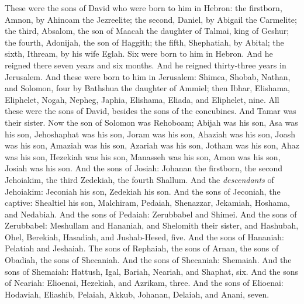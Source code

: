 \begin{biblechapter} %
 These were the sons of David who were born to him in Hebron: the firstborn, Amnon, by Ahinoam the Jezreelite; the second, Daniel, by Abigail the Carmelite;
\verse the third, Absalom, the son of Maacah the daughter of Talmai, king of Geshur; the fourth, Adonijah, the son of Haggith;
\verse the fifth, Shephatiah, by Abital; the sixth, Ithream, by his wife Eglah.
\verse Six were born to him in Hebron. And he reigned there seven years and six months. And he reigned thirty-three years in Jerusalem.
\verse And these were born to him in Jerusalem: Shimea, Shobab, Nathan, and Solomon, four by Bathshua the daughter of Ammiel;
\verse then Ibhar, Elishama, Eliphelet,
\verse Nogah, Nepheg, Japhia,
\verse Elishama, Eliada, and Eliphelet, nine.
\verse All these were the sons of David, besides the sons of the concubines. And Tamar was their sister.
\verse Now the son of Solomon was Rehoboam; Abijah was his son, Asa was his son, Jehoshaphat was his son,
\verse Joram was his son, Ahaziah was his son, Joash was his son,
\verse Amaziah was his son, Azariah was his son, Jotham was his son,
\verse Ahaz was his son, Hezekiah was his son, Manasseh was his son,
\verse Amon was his son, Josiah was his son.
\verse And the sons of Josiah: Johanan the firstborn, the second Jehoiakim, the third Zedekiah, the fourth Shallum.
\verse And the \textit{descendants} of Jehoiakim: Jeconiah his son, Zedekiah his son.
\verse And the sons of Jeconiah, the captive: Shealtiel his son,
\verse Malchiram, Pedaiah, Shenazzar, Jekamiah, Hoshama, and Nedabiah.
\verse And the sons of Pedaiah: Zerubbabel and Shimei. And the sons of Zerubbabel: Meshullam and Hananiah, and Shelomith their sister,
\verse and Hashubah, Ohel, Berekiah, Hasadiah, and Jushab-Hesed, five.
\verse And the sons of Hananiah: Pelatiah and Jeshaiah. The sons of Rephaiah, the sons of Arnan, the sons of Obadiah, the sons of Shecaniah.
\verse And the sons of Shecaniah: Shemaiah. And the sons of Shemaiah: Hattush, Igal, Bariah, Neariah, and Shaphat, six.
\verse And the sons of Neariah: Elioenai, Hezekiah, and Azrikam, three.
\verse And the sons of Elioenai: Hodaviah, Eliashib, Pelaiah, Akkub, Johanan, Delaiah, and Anani, seven.
\end{biblechapter}

